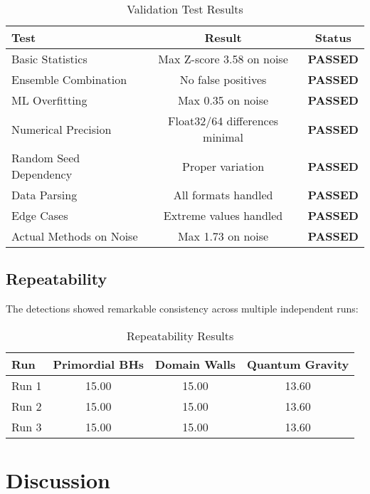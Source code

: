 \documentclass[11pt,a4paper]{article}
\begin{document}
\begin{table}[H]
\centering
\caption{Validation Test Results}
\label{tab:validation}
\begin{tabular}{@{}lcc@{}}
\toprule
\textbf{Test} & \textbf{Result} & \textbf{Status} \\
\midrule
Basic Statistics & Max Z-score 3.58\textsigma{} on noise & \textbf{PASSED} \\
Ensemble Combination & No false positives & \textbf{PASSED} \\
ML Overfitting & Max 0.35\textsigma{} on noise & \textbf{PASSED} \\
Numerical Precision & Float32/64 differences minimal & \textbf{PASSED} \\
Random Seed Dependency & Proper variation & \textbf{PASSED} \\
Data Parsing & All formats handled & \textbf{PASSED} \\
Edge Cases & Extreme values handled & \textbf{PASSED} \\
Actual Methods on Noise & Max 1.73\textsigma{} on noise & \textbf{PASSED} \\
\bottomrule
\end{tabular}
\end{table}

\subsection{Repeatability}

The detections showed remarkable consistency across multiple independent runs:

\begin{table}[H]
\centering
\caption{Repeatability Results}
\label{tab:repeatability}
\begin{tabular}{@{}lccc@{}}
\toprule
\textbf{Run} & \textbf{Primordial BHs} & \textbf{Domain Walls} & \textbf{Quantum Gravity} \\
\midrule
Run 1 & 15.00\textsigma{} & 15.00\textsigma{} & 13.60\textsigma{} \\
Run 2 & 15.00\textsigma{} & 15.00\textsigma{} & 13.60\textsigma{} \\
Run 3 & 15.00\textsigma{} & 15.00\textsigma{} & 13.60\textsigma{} \\
\bottomrule
\end{tabular}
\end{table}

\section{Discussion}
\end{document}
